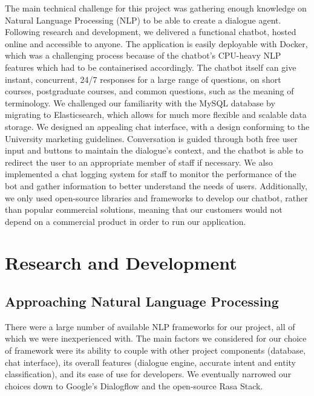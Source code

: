 \documentclass{l3proj}
\begin{document}
The main technical challenge for this project was gathering enough knowledge on Natural Language Processing (NLP) to be able to create a dialogue agent. Following research and development, we delivered a functional chatbot, hosted online and accessible to anyone. The application is easily deployable with Docker, which was a challenging process because of the chatbot's CPU-heavy NLP features which had to be containerised accordingly. The chatbot itself can give instant, concurrent, 24/7 responses for a large range of questions, on short courses, postgraduate courses, and common questions, such as the meaning of terminology. We challenged our familiarity with the MySQL database by migrating to Elasticsearch, which allows for much more flexible and scalable data storage. We designed an appealing chat interface, with a design conforming to the University marketing guidelines\cite{brandguidelines}. Conversation is guided through both free user input and buttons to maintain the dialogue's context, and the chatbot is able to redirect the user to an appropriate member of staff if necessary. We also implemented a chat logging system for staff to monitor the performance of the bot and gather information to better understand the needs of users. Additionally, we only used open-source libraries and frameworks to develop our chatbot, rather than popular commercial solutions, meaning that our customers would not depend on a commercial product in order to run our application.

\section{Research and Development}
\label{sec:rationale}

\subsection{Approaching Natural Language Processing}

There were a large number of available NLP frameworks for our project, all of which we were inexperienced with. The main factors we considered for our choice of framework were its ability to couple with other project components (database, chat interface), its overall features (dialogue engine, accurate intent and entity classification), and its ease of use for developers. We eventually narrowed our choices down to Google's Dialogflow and the open-source Rasa Stack.
\end{document}
